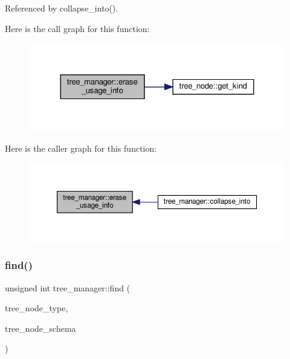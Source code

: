 Referenced by collapse\+\_\+into().

Here is the call graph for this function\+:
\nopagebreak
\begin{figure}[H]
\begin{center}
\leavevmode
\includegraphics[width=324pt]{d2/ddd/classtree__manager_abfb19a0d854ad4584c06301f693349fe_cgraph}
\end{center}
\end{figure}
Here is the caller graph for this function\+:
\nopagebreak
\begin{figure}[H]
\begin{center}
\leavevmode
\includegraphics[width=350pt]{d2/ddd/classtree__manager_abfb19a0d854ad4584c06301f693349fe_icgraph}
\end{center}
\end{figure}
\mbox{\label{classtree__manager_aeb1203c36b76b27e3b322d4a8cfc55d8}} 
\subsubsection{\texorpdfstring{find()}{find()}}
{\footnotesize\ttfamily unsigned int tree\+\_\+manager\+::find (\begin{DoxyParamCaption}\item[{enum \hyperlink{tree__common_8hpp_a9efbd7c7191fb190b76c2fd05d6e7b45}{kind}}]{tree\+\_\+node\+\_\+type,  }\item[{const std\+::map$<$ \hyperlink{token__interface_8hpp_a14502d0757789149f644966ca931b126}{Tree\+Vocabulary\+Token\+Types\+\_\+\+Token\+Enum}, std\+::string $>$ \&}]{tree\+\_\+node\+\_\+schema }\end{DoxyParamCaption})}



